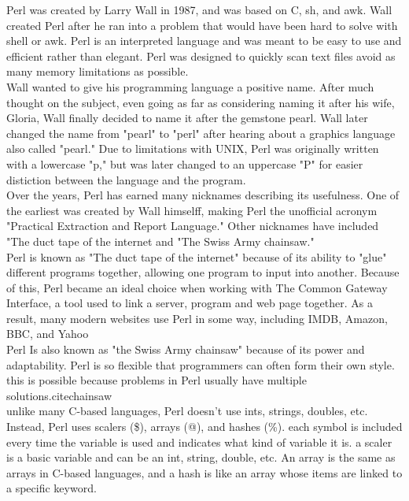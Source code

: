 \documentclass[12pt]{article}
\begin{document}
\doublespacing
Perl was created by Larry Wall in 1987, and was based on C, sh, and awk.\cite{timeline} Wall created Perl after he ran into a problem that would have been hard to solve with shell or awk.\cite{interview} Perl is an interpreted language and was meant to be easy to use and efficient rather than elegant.\cite{manpage} Perl was designed to quickly scan text files avoid as many memory limitations as possible.\cite{manpage}\\ 

Wall wanted to give his programming language a positive name. After much thought on the subject, even going as far as considering naming it after his wife, Gloria, Wall finally decided to name it after the gemstone pearl. Wall later changed the name from "pearl" to "perl" after hearing about a graphics language also called "pearl." Due to limitations with UNIX, Perl was originally written with a lowercase "p," but was later changed to an uppercase "P" for easier distiction between the language and the program.\cite{interview}\\

Over the years, Perl has earned many nicknames describing its usefulness. One of the earliest was created by Wall himselff, making Perl the unofficial acronym "Practical Extraction and Report Language."\cite{interview} Other nicknames have included "The duct tape of the internet\cite {internet} and "The Swiss Army chainsaw."\cite{chainsaw} \\

Perl is known as "The duct tape of the internet" because of its ability to "glue" different programs together, allowing one program to input into another. Because of this, Perl became an ideal choice when working with The Common Gateway Interface, a tool used to link a server, program and web page together.\cite{internet} As a result, many modern websites use Perl in some way, including IMDB, Amazon, BBC, and Yahoo\cite{list}\cite{joy}\\

Perl Is also known as "the Swiss Army chainsaw" because of its power and adaptability. Perl is so flexible that programmers can often form their own style. this is possible because problems in Perl usually have multiple solutions.cite{chainsaw}\\

unlike many C-based languages, Perl doesn't use ints, strings, doubles, etc. Instead, Perl uses scalers (\$), arrays (@), and hashes (\%). each symbol is included every time the variable is used and indicates what kind of variable it is. a scaler is a basic variable and can be an int, string, double, etc. An array is the same as arrays in C-based languages, and a hash is like an array whose items are linked to a specific keyword.\cite{chainsaw}\\
\end{document}
